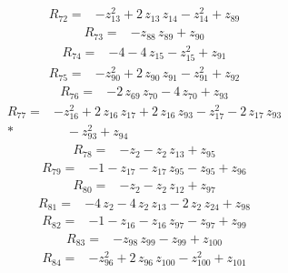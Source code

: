 \documentclass[10pt]{article}
\begin{document}
\begin{align*}
R_{72}={}& - z_{13}^{2} + 2\,z_{13}\,z_{14} - z_{14}^{2} + z_{89}
\end{align*}
\begin{align*}
R_{73}={}& - z_{88}\,z_{89} + z_{90}
\end{align*}
\begin{align*}
R_{74}={}& - 4 - 4\,z_{15} - z_{15}^{2} + z_{91}
\end{align*}
\begin{align*}
R_{75}={}& - z_{90}^{2} + 2\,z_{90}\,z_{91} - z_{91}^{2} + z_{92}
\end{align*}
\begin{align*}
R_{76}={}& - 2\,z_{69}\,z_{70} - 4\,z_{70} + z_{93}
\end{align*}
\begin{align*}
R_{77}={}& - z_{16}^{2} + 2\,z_{16}\,z_{17} + 2\,z_{16}\,z_{93} - z_{17}^{2} - 2\,z_{17}\,z_{93} \\*
&\quad - z_{93}^{2} + z_{94}
\end{align*}
\begin{align*}
R_{78}={}& - z_{2} - z_{2}\,z_{13} + z_{95}
\end{align*}
\begin{align*}
R_{79}={}& - 1 - z_{17} - z_{17}\,z_{95} - z_{95} + z_{96}
\end{align*}
\begin{align*}
R_{80}={}& - z_{2} - z_{2}\,z_{12} + z_{97}
\end{align*}
\begin{align*}
R_{81}={}& - 4\,z_{2} - 4\,z_{2}\,z_{13} - 2\,z_{2}\,z_{24} + z_{98}
\end{align*}
\begin{align*}
R_{82}={}& - 1 - z_{16} - z_{16}\,z_{97} - z_{97} + z_{99}
\end{align*}
\begin{align*}
R_{83}={}& - z_{98}\,z_{99} - z_{99} + z_{100}
\end{align*}
\begin{align*}
R_{84}={}& - z_{96}^{2} + 2\,z_{96}\,z_{100} - z_{100}^{2} + z_{101}
\end{align*}
\end{document}
